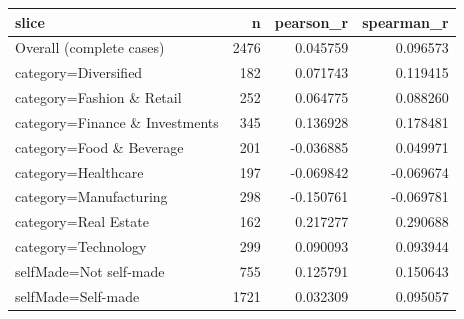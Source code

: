 \begin{tabular}{lrrr}
\toprule
slice & n & pearson\_r & spearman\_r \\
\midrule
Overall (complete cases) & 2476 & 0.045759 & 0.096573 \\
category=Diversified & 182 & 0.071743 & 0.119415 \\
category=Fashion \& Retail & 252 & 0.064775 & 0.088260 \\
category=Finance \& Investments & 345 & 0.136928 & 0.178481 \\
category=Food \& Beverage & 201 & -0.036885 & 0.049971 \\
category=Healthcare & 197 & -0.069842 & -0.069674 \\
category=Manufacturing & 298 & -0.150761 & -0.069781 \\
category=Real Estate & 162 & 0.217277 & 0.290688 \\
category=Technology & 299 & 0.090093 & 0.093944 \\
selfMade=Not self-made & 755 & 0.125791 & 0.150643 \\
selfMade=Self-made & 1721 & 0.032309 & 0.095057 \\
\bottomrule
\end{tabular}
